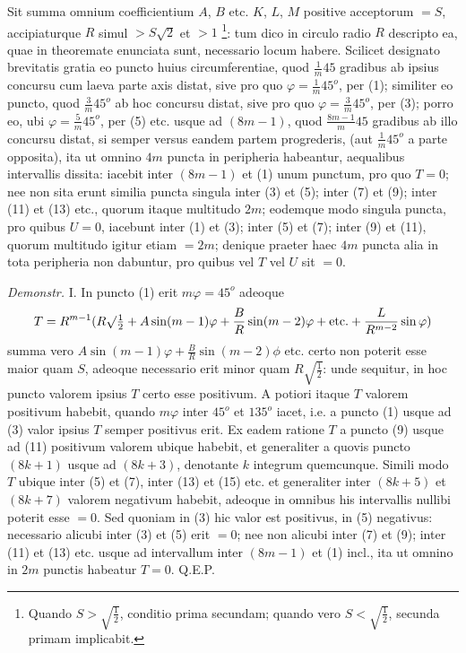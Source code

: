 \documentclass[14pt]{memoir}
\theoremstyle{plain}
\theoremstyle{remark}
\begin{document}
Sit summa omnium coefficientium \(A\), \(B\) etc. \(K\), \(L\), \(M\) positive acceptorum \(= S\), accipiaturque \(R\) simul \(>S\surd{2}\) et \(>1\) \footnote{Quando \(S>\surd{\tfrac{1}{2}}\), conditio prima secundam; quando vero \(S<\surd{\tfrac{1}{2}}\), secunda primam implicabit.}: tum dico in circulo radio \(R\) descripto ea, quae in theoremate enunciata sunt, necessario locum habere. Scilicet designato brevitatis gratia eo puncto huius circumferentiae, quod \(\frac{1}{m}45\) gradibus ab ipsius concursu cum laeva parte axis distat, sive pro quo \(\varphi = \frac{1}{m} 45^o\), per (1); similiter eo puncto, quod \(\frac{3}{m} 45^o\) ab hoc concursu distat, sive pro quo \(\varphi = \frac{3}{m} 45^o\), per (3); porro eo, ubi \(\varphi = \frac{5}{m} 45^o\), per (5) etc. usque ad \((8m-1)\), quod \(\frac{8m-1}{m} 45\) gradibus ab illo concursu distat, si semper versus eandem partem progrederis, (aut \(\frac{1}{m}45^o\) a parte opposita), ita ut omnino \(4m\) puncta in peripheria habeantur, aequalibus intervallis dissita: iacebit inter \((8m-1)\) et (1) unum punctum, pro quo \(T= 0\); nee non sita erunt similia puncta singula inter (3) et (5); inter (7) et (9); inter (11) et (13) etc., quorum itaque multitudo \(2m\); eodemque modo singula puncta, pro quibus \(U=0\), iacebunt inter (1) et (3); inter (5) et (7); inter (9) et (11), quorum multitudo igitur etiam \(= 2m\); denique praeter haec \(4m\) puncta alia in tota peripheria non dabuntur, pro quibus vel \(T\) vel \(U\) sit \(= 0\).

\textit{Demonstr.} I. In puncto (1) erit  \(m\varphi = 45^o\) adeoque \[ T = R^{m-1}(R\surd \tfrac{1}{2} + A \sin (m-1)\varphi + \frac{B}{R} \sin (m-2) \varphi + \text{etc.}+\frac{L}{R^{m-2}}\sin \varphi )\] summa vero \(A \sin (m-1) \varphi + \frac{B}{R} \sin (m-2) \phi \) etc. certo non poterit esse maior quam \(S\), adeoque necessario erit minor quam \(R\surd{\tfrac{1}{2}}\): unde sequitur, in hoc puncto valorem ipsius \(T\) certo esse positivum. A potiori itaque \(T\) valorem positivum habebit, quando \(m\varphi\) inter \(45^o\) et \(135^o\) iacet, i.e. a puncto (1) usque ad (3) valor ipsius \(T\) semper positivus erit. Ex eadem ratione \(T\) a puncto (9) usque ad (11) positivum valorem ubique habebit, et generaliter a quovis puncto \((8k+1)\) usque ad \((8k+3)\), denotante \(k\) integrum quemcunque. Simili modo \(T\) ubique inter (5) et (7), inter (13) et (15) etc. et generaliter inter \((8k + 5)\) et \((8k+7)\) valorem negativum habebit, adeoque in omnibus his intervallis nullibi poterit esse \(= 0\). Sed quoniam in (3) hic valor est positivus, in (5) negativus: necessario alicubi inter (3) et (5) erit \(= 0\);  nee non alicubi inter (7) et (9);  inter (11) et (13) etc. usque ad intervallum inter \((8m-1)\) et (1) incl., ita ut omnino in \(2m\) punctis habeatur  \(T = 0\).  Q.E.P.
\end{document}
